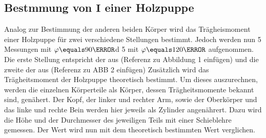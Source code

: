     \subsection{Bestmmung von $\symbf{I}$ einer Holzpuppe}
    Analog zur Bestimmung der anderen beiden Körper wird das Trägheismoment einer Holzpuppe für zwei verschiedene Stellungen bestimmt.
    Jedoch werden nun 5 Messungen mit $\varphi\equals90\degree$d 5  mit $\varphi\equals120\degree$ aufgenommen.
    Die erste Stellung entspricht der aus (Referenz zu Abbildung 1 einfügen) und die zweite der aus (Referenz zu ABB 2 einfügen)
    Zusätzlich wird das Trägheitsmoment der Holzpuppe theoretisch bestimmt.
    Um dieses auszurechnen, werden die einzelnen Körperteile als Körper, dessen Trägheitsmomente bekannt sind, genähert.
    Der Kopf, der linker und rechter Arm, sowie der Oberkörper und das linke und rechte Bein werden hier jeweils als Zylinder angenährert.
    Dazu wird die Höhe und der Durchmesser des jeweiligen Teils mit einer Schieblehre gemessen.
    Der Wert wird nun mit dem theoretisch bestimmten Wert verglichen.